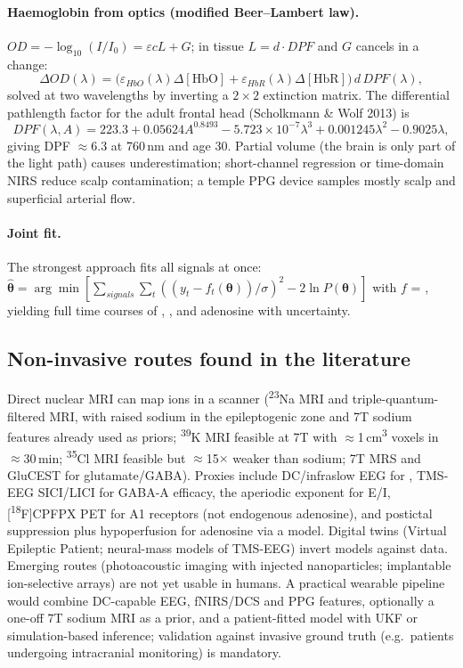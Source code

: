 \paragraph{Haemoglobin from optics (modified Beer--Lambert law).} $OD = -\log_{10}(I/I_0) = \varepsilon cL + G$; in tissue $L = d\cdot DPF$ and $G$ cancels in a change:
\begin{equation}
\Delta OD(\lambda) = \big(\varepsilon_{HbO}(\lambda)\Delta[\mathrm{HbO}] + \varepsilon_{HbR}(\lambda)\Delta[\mathrm{HbR}]\big)\,d\,DPF(\lambda),
\end{equation}
solved at two wavelengths by inverting a $2\times2$ extinction matrix. The differential pathlength factor for the adult frontal head (Scholkmann \& Wolf 2013) is
\begin{equation}
DPF(\lambda,A) = 223.3 + 0.05624A^{0.8493} - 5.723\times10^{-7}\lambda^3 + 0.001245\lambda^2 - 0.9025\lambda,
\end{equation}
giving DPF $\approx$6.3 at 760\,nm and age 30. Partial volume (the brain is only part of the light path) causes underestimation; short-channel regression or time-domain NIRS reduce scalp contamination; a temple PPG device samples mostly scalp and superficial arterial flow.

\paragraph{Joint fit.} The strongest approach fits all signals at once: $\hat{\boldsymbol\theta} = \arg\min[\sum_{signals}\sum_t((y_t-f_t(\boldsymbol\theta))/\sigma)^2 - 2\ln P(\boldsymbol\theta)]$ with $f$ = , yielding full time courses of \Ko, \Cli, \EGABA{} and adenosine with uncertainty.

\subsection{Non-invasive routes found in the literature}

Direct nuclear MRI can map ions in a scanner (\textsuperscript{23}Na MRI and triple-quantum-filtered MRI, with raised sodium in the epileptogenic zone and 7T sodium features already used as priors; \textsuperscript{39}K MRI feasible at 7T with $\approx$1\,cm\textsuperscript{3} voxels in $\approx$30\,min; \textsuperscript{35}Cl MRI feasible but $\approx$15$\times$ weaker than sodium; 7T MRS and GluCEST for glutamate/GABA). Proxies include DC/infraslow EEG for \Kp, TMS-EEG SICI/LICI for GABA-A efficacy, the aperiodic exponent for E/I, [\textsuperscript{18}F]CPFPX PET for A1 receptors (not endogenous adenosine), and postictal suppression plus hypoperfusion for adenosine via a model. Digital twins (Virtual Epileptic Patient; neural-mass models of TMS-EEG) invert models against data. Emerging routes (photoacoustic \Kp{} imaging with injected nanoparticles; implantable ion-selective arrays) are not yet usable in humans. A practical wearable pipeline would combine DC-capable EEG, fNIRS/DCS and PPG features, optionally a one-off 7T sodium MRI as a prior, and a patient-fitted model with UKF or simulation-based inference; validation against invasive ground truth (e.g.\ patients undergoing intracranial monitoring) is mandatory.

